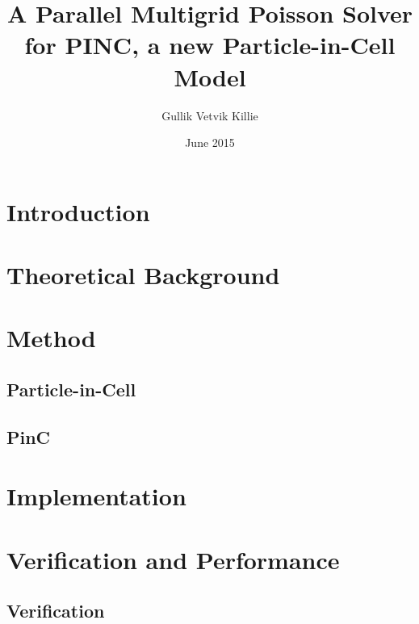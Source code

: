 \documentclass[x11names,twoside,english]{uiofysmaster}
\author{Gullik Vetvik Killie}
\title{A Parallel Multigrid Poisson Solver for PINC, a new Particle-in-Cell
    Model}
\date{June 2015}
\begin{document}
\maketitle

%
\tableofcontents

\chapter{Introduction}
    

\chapter{Theoretical Background}
	\label{sec:theory}
    
    
    
    
    
    
    
%
\chapter{Method}
	\label{sec:Method}
    
	\section{Particle-in-Cell}
    
    
	\section{PinC}
	
    
    
    
    
    

\chapter{Implementation}
	\label{sec:impl}
    
    
    
    

\chapter{Verification and Performance}
	\label{sec:ver_perf}
	\section{Verification}
    
    
    
    
    
    
\end{document}
